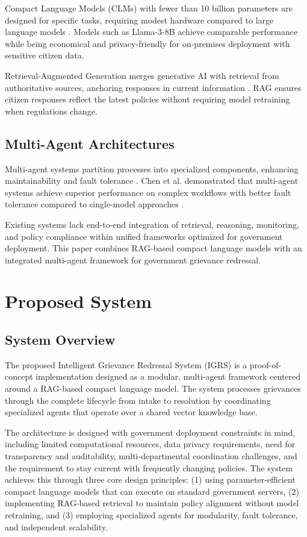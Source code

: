 \documentclass[conference]{IEEEtran}
\begin{document}
Compact Language Models (CLMs) with fewer than 10 billion parameters are designed for specific tasks, requiring modest hardware compared to large language models \cite{b5}. Models such as Llama-3-8B achieve comparable performance while being economical and privacy-friendly for on-premises deployment with sensitive citizen data.

Retrieval-Augmented Generation merges generative AI with retrieval from authoritative sources, anchoring responses in current information \cite{b6}. RAG ensures citizen responses reflect the latest policies without requiring model retraining when regulations change.

\subsection{Multi-Agent Architectures}

Multi-agent systems partition processes into specialized components, enhancing maintainability and fault tolerance \cite{b7}. Chen et al. demonstrated that multi-agent systems achieve superior performance on complex workflows with better fault tolerance compared to single-model approaches \cite{b7}.

Existing systems lack end-to-end integration of retrieval, reasoning, monitoring, and policy compliance within unified frameworks optimized for government deployment. This paper combines RAG-based compact language models with an integrated multi-agent framework for government grievance redressal.

\section{Proposed System}

\subsection{System Overview}

The proposed Intelligent Grievance Redressal System (IGRS) is a proof-of-concept implementation designed as a modular, multi-agent framework centered around a RAG-based compact language model. The system processes grievances through the complete lifecycle from intake to resolution by coordinating specialized agents that operate over a shared vector knowledge base.

The architecture is designed with government deployment constraints in mind, including limited computational resources, data privacy requirements, need for transparency and auditability, multi-departmental coordination challenges, and the requirement to stay current with frequently changing policies. The system achieves this through three core design principles: (1) using parameter-efficient compact language models that can execute on standard government servers, (2) implementing RAG-based retrieval to maintain policy alignment without model retraining, and (3) employing specialized agents for modularity, fault tolerance, and independent scalability.
\end{document}
